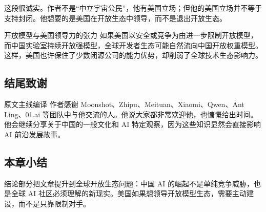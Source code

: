 这段很诚实。作者不是``中立宇宙公民''，他有美国立场；但他的美国立场并不等于支持封闭。他想要的是美国在开放生态中领导，而不是退出开放生态。

\begin{warningbox}{开放模型与美国领导力的张力}
如果美国以安全或竞争为由进一步限制开放模型，而中国实验室持续开放强模型，全球开发者生态可能自然流向中国开放权重模型。这样，美国也许保住了少数闭源公司的能力优势，却削弱了全球技术生态影响力。
\end{warningbox}

\subsection{结尾致谢}

\begin{translationbox}{原文主线编译}
作者感谢 Moonshot、Zhipu、Meituan、Xiaomi、Qwen、Ant Ling、01.ai 等团队中与他交流的人。他说大家都非常欢迎他，也慷慨给出时间。他会继续分享关于中国的一般文化和 AI 特定观察，因为这些知识显然会直接影响 AI 前沿发展故事。
\end{translationbox}

\subsection{本章小结}

结论部分把文章提升到全球开放生态问题：中国 AI 的崛起不是单纯竞争威胁，也是全球 AI 社区必须理解的新现实。美国如果想领导开放模型生态，需要主动建设，而不是只靠限制对手。


